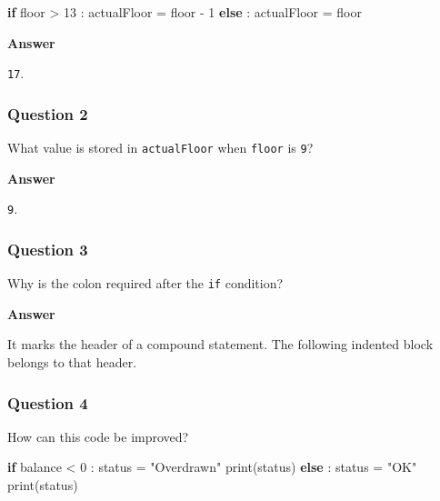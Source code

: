\documentclass[
  11pt,
  a4paper,
]{article}
\newenvironment{Shaded}{}{}
\newcommand{\BuiltInTok}[1]{\textcolor[rgb]{0.00,0.50,0.00}{#1}}
\newcommand{\ControlFlowTok}[1]{\textcolor[rgb]{0.00,0.44,0.13}{\textbf{#1}}}
\newcommand{\DecValTok}[1]{\textcolor[rgb]{0.25,0.63,0.44}{#1}}
\newcommand{\NormalTok}[1]{#1}
\newcommand{\OperatorTok}[1]{\textcolor[rgb]{0.40,0.40,0.40}{#1}}
\newcommand{\StringTok}[1]{\textcolor[rgb]{0.25,0.44,0.63}{#1}}
\begin{document}
\begin{Shaded}
\begin{Highlighting}[]
\ControlFlowTok{if}\NormalTok{ floor }\OperatorTok{\textgreater{}} \DecValTok{13}\NormalTok{ :}
\NormalTok{    actualFloor }\OperatorTok{=}\NormalTok{ floor }\OperatorTok{{-}} \DecValTok{1}
\ControlFlowTok{else}\NormalTok{ :}
\NormalTok{    actualFloor }\OperatorTok{=}\NormalTok{ floor}
\end{Highlighting}
\end{Shaded}

\textbf{Answer}

\texttt{17}.

\subsubsection{Question 2}\label{question-2}

What value is stored in \texttt{actualFloor} when \texttt{floor} is
\texttt{9}?

\textbf{Answer}

\texttt{9}.

\subsubsection{Question 3}\label{question-3}

Why is the colon required after the \texttt{if} condition?

\textbf{Answer}

It marks the header of a compound statement. The following indented
block belongs to that header.

\subsubsection{Question 4}\label{question-4}

How can this code be improved?

\begin{Shaded}
\begin{Highlighting}[]
\ControlFlowTok{if}\NormalTok{ balance }\OperatorTok{\textless{}} \DecValTok{0}\NormalTok{ :}
\NormalTok{    status }\OperatorTok{=} \StringTok{"Overdrawn"}
    \BuiltInTok{print}\NormalTok{(status)}
\ControlFlowTok{else}\NormalTok{ :}
\NormalTok{    status }\OperatorTok{=} \StringTok{"OK"}
    \BuiltInTok{print}\NormalTok{(status)}
\end{Highlighting}
\end{Shaded}
\end{document}
